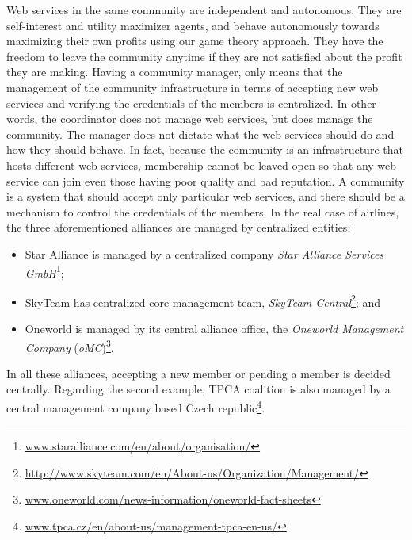 \documentclass[10pt,journal,cspaper,compsoc]{IEEEtran}
\begin{document}
Web services in the same community are independent and autonomous.
They are self-interest and utility maximizer agents, and behave
autonomously towards maximizing their own profits using our game
theory approach. They have the freedom to leave the community
anytime if they are not satisfied about the profit they are
making. Having a community manager, only means that the management
of the community infrastructure in terms of accepting new web
services and verifying the credentials of the members is
centralized. In other words, the coordinator does not manage web
services, but does manage the community. The manager does not
dictate what the web services should do and how they should
behave. In fact, because the community is an infrastructure that
hosts different web services, membership cannot be leaved open so
that any web service can join even those having poor quality and
bad reputation. A community is a system that should accept only
particular web services, and there should be a mechanism to
control the credentials of the members. In the real case of
airlines, the three aforementioned alliances are managed by
centralized entities:
%
\begin{itemize}
%
\item Star Alliance is managed by a centralized company \emph{Star
Alliance Services
GmbH}\footnote{\url{www.staralliance.com/en/about/organisation/}};
%
\item SkyTeam has centralized core management team, \emph{SkyTeam
Central}\footnote{\url{http://www.skyteam.com/en/About-us/Organization/Management/}};
and
%
\item Oneworld is managed by its central alliance office, the
\emph{Oneworld Management Company}
(\emph{oMC})\footnote{\url{www.oneworld.com/news-information/oneworld-fact-sheets}}.
%
\end{itemize}
%
In all these alliances, accepting a new member or pending a member
is decided centrally. Regarding the second example, TPCA coalition
is also managed by a central management company based Czech
republic\footnote{\url{www.tpca.cz/en/about-us/management-tpca-en-us/}}.
\end{document}
